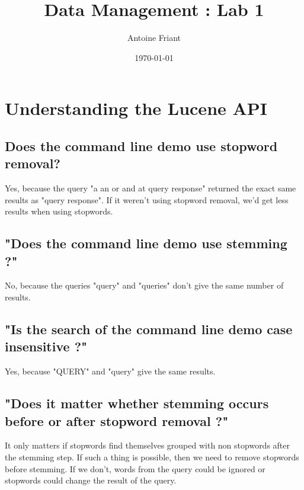 \documentclass[11pt,a4paper,twoside,svgnames]{article}
\title{\color{DarkGreen}\huge\bfseries Data Management : Lab 1}
\author{Antoine Friant}
\date{\today}
\begin{document}
	
	\maketitle
	
	\section{Understanding the Lucene API}
	
	\subsection{Does the command line demo use stopword removal?}
	Yes, because the query "a an or and at query response" returned the exact same results as "query response". If it weren't using stopword removal, we'd get less results when using stopwords.
	
	\subsection{"Does the command line demo use stemming ?"}
	No, because the queries "query" and "queries" don't give the same number of results.
	
	\subsection{"Is the search of the command line demo case insensitive ?"}
	Yes, because "QUERY" and "query" give the same results.
	
	\subsection{"Does it matter whether stemming occurs before or after stopword removal ?"}
	It only matters if stopwords find themselves grouped with non stopwords after the stemming step. If such a thing is possible, then we need to remove stopwords before stemming. If we don't, words from the query could be ignored or stopwords could change the result of the query.
	
	\section{}
	
\end{document}
